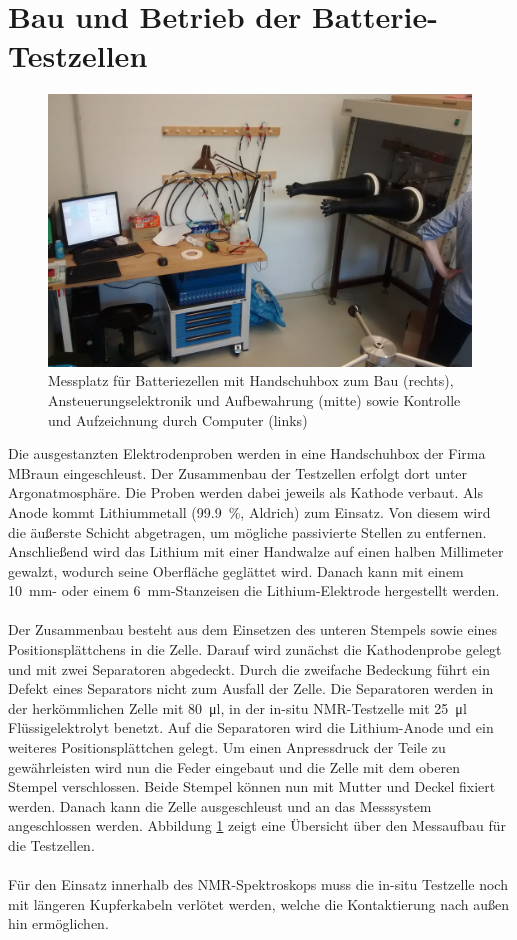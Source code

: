 \documentclass[a4paper, 11pt, headsepline,footsepline,twoside,abstract]{scrbook}
\begin{document}
\section{Bau und Betrieb der Batterie-Testzellen}
\label{bau_zellen}
\begin{figure}
	\centering
	\includegraphics[width=0.95\columnwidth]{images/Messplatz.jpg}
	\caption{Messplatz für Batteriezellen mit Handschuhbox zum Bau (rechts), Ansteuerungselektronik und Aufbewahrung (mitte) sowie Kontrolle und Aufzeichnung durch Computer (links)}
	\label{messaufbau}
\end{figure}
Die ausgestanzten Elektrodenproben werden in eine Handschuhbox der Firma MBraun eingeschleust. Der Zusammenbau der Testzellen erfolgt dort unter Argonatmosphäre. Die Proben werden dabei jeweils als Kathode verbaut. Als Anode kommt Lithiummetall (\SI{99.9}{\percent}, Aldrich) zum Einsatz. Von diesem wird die äußerste Schicht abgetragen, um mögliche passivierte Stellen zu entfernen. Anschließend wird das Lithium mit einer Handwalze auf einen halben Millimeter gewalzt, wodurch seine Oberfläche geglättet wird. Danach kann mit einem \SI{10}{\milli\metre}- oder einem \SI{6}{\milli\metre}-Stanzeisen die Lithium-Elektrode hergestellt werden.
\\\\
Der Zusammenbau besteht aus dem Einsetzen des unteren Stempels sowie eines Positionsplättchens in die Zelle. Darauf wird zunächst die Kathodenprobe gelegt und mit zwei Separatoren abgedeckt. Durch die zweifache Bedeckung führt ein Defekt eines Separators nicht zum Ausfall der Zelle. Die Separatoren werden in der herkömmlichen Zelle mit \SI{80}{\micro\litre}, in der in-situ NMR-Testzelle mit \SI{25}{\micro\litre} Flüssigelektrolyt benetzt. Auf die Separatoren wird die Lithium-Anode und ein weiteres Positionsplättchen gelegt. Um einen Anpressdruck der Teile zu gewährleisten wird nun die Feder eingebaut und die Zelle mit dem oberen Stempel verschlossen. Beide Stempel können nun mit Mutter und Deckel fixiert werden. Danach kann die Zelle ausgeschleust und an das Messsystem angeschlossen werden. Abbildung \ref{messaufbau} zeigt eine Übersicht über den Messaufbau für die Testzellen.
\\\\
Für den Einsatz innerhalb des NMR-Spektroskops muss die in-situ Testzelle noch mit längeren Kupferkabeln verlötet werden, welche die Kontaktierung nach außen hin ermöglichen.
\end{document}
